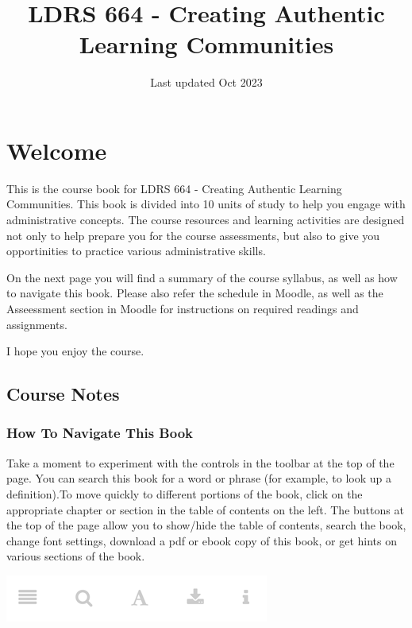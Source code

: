 \documentclass[
]{book}
\title{LDRS 664 - Creating Authentic Learning Communities}
\author{}
\date{\vspace{-2.5em}Last updated Oct 2023}
\begin{document}
\maketitle

{
\setcounter{tocdepth}{1}
\tableofcontents
}
\hypertarget{welcome}{%
\chapter*{Welcome}\label{welcome}}

This is the course book for LDRS 664 - Creating Authentic Learning Communities. This book is divided into 10 units of study to help you engage with administrative concepts. The course resources and learning activities are designed not only to help prepare you for the course assessments, but also to give you opportinities to practice various administrative skills.

On the next page you will find a summary of the course syllabus, as well as how to navigate this book. Please also refer the schedule in Moodle, as well as the Asseessment section in Moodle for instructions on required readings and assignments.

I hope you enjoy the course.

\hypertarget{course-notes}{%
\section*{Course Notes}\label{course-notes}}

\hypertarget{how-to-navigate-this-book}{%
\subsection*{How To Navigate This Book}\label{how-to-navigate-this-book}}

Take a moment to experiment with the controls in the toolbar at the top of the page. You can search this book for a word or phrase (for example, to look up a definition).To move quickly to different portions of the book, click on the appropriate chapter or section in the table of contents on the left. The buttons at the top of the page allow you to show/hide the table of contents, search the book, change font settings, download a pdf or ebook copy of this book, or get hints on various sections of the book.

\includegraphics{assets/course-intro/menu.png}
\end{document}
